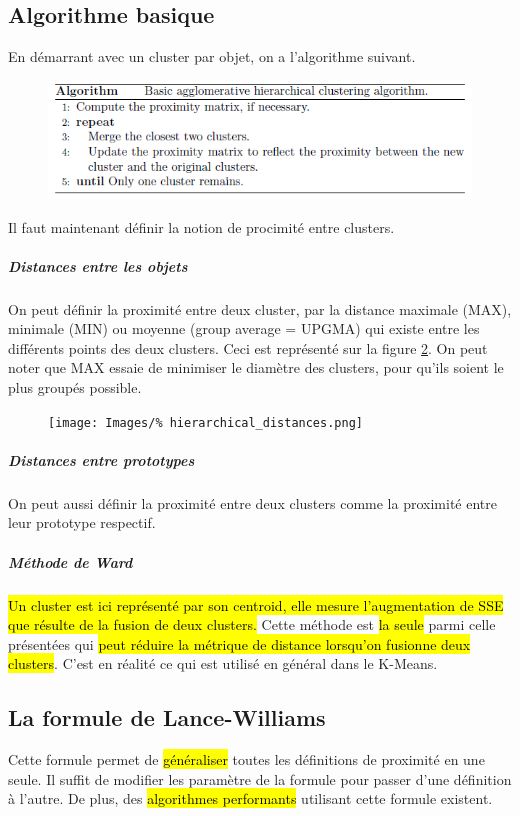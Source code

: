 \documentclass[letterpaper, 12pt]{article}
\newcommand{\alinea}{
\hspace*{0.5cm}}
\begin{document}
		\subsection{Algorithme basique}
			\alinea En démarrant avec un cluster par objet, on a 
				l'algorithme suivant.
			\begin{figure}[H]
				\centering
				\includegraphics[scale=0.8]{Images/basic_hierarchical_algo.png}
				\caption{}
				\label{fig:hierarchical:basic_algo}
			\end{figure}\noindent
			\alinea Il faut maintenant définir la notion de procimité entre
				clusters.
			\subparagraph{Distances entre les objets} On peut définir la 
				proximité entre deux cluster, par la distance maximale (MAX),
				minimale (MIN) ou moyenne (group average = UPGMA)
				qui existe entre les différents
				points des deux clusters. Ceci est représenté sur la figure
				\ref{fig:hierarchical:distances}. On peut noter que
				MAX essaie de minimiser le diamètre des clusters, pour 
				qu'ils soient le plus groupés possible.
				\begin{figure}[H]
					\centering
					\texttt{[image: Images/\%
						hierarchical\_distances.png]}
					\caption{}
					\label{fig:hierarchical:distances}
				\end{figure}\noindent
			\subparagraph{Distances entre prototypes} On peut aussi définir
				la proximité entre deux clusters comme la proximité entre 
				leur prototype respectif.
			\subparagraph{Méthode de Ward} \hl{Un cluster est ici représenté
				par son centroid, elle mesure l'augmentation de SSE que
				résulte de la fusion de deux clusters.} Cette méthode
				est \hl{la seule} parmi celle présentées qui 
				\hl{peut réduire la	métrique de distance lorsqu'on 
				fusionne deux clusters}. C'est en réalité ce qui est
				utilisé en général dans le K-Means.
		\subsection{La formule de Lance-Williams}
			\alinea Cette formule permet de \hl{généraliser} toutes
				les définitions de proximité en une seule. Il suffit
				de modifier les paramètre de la formule pour passer
				d'une définition à l'autre. De plus, des \hl{algorithmes
				performants} utilisant cette formule existent.
\end{document}
